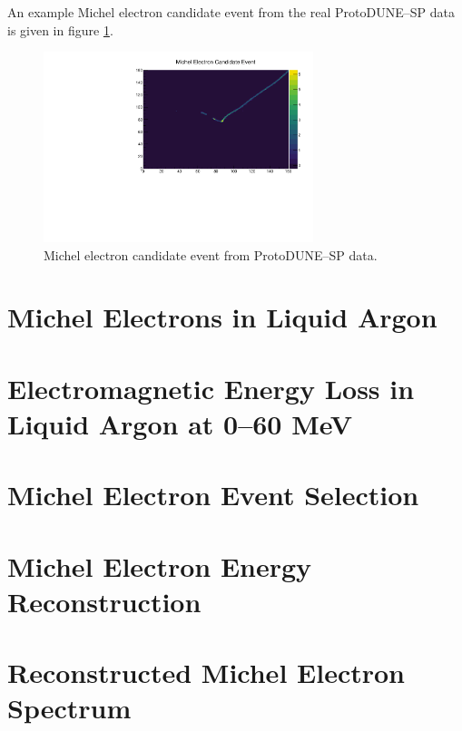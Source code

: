 \noindent An example Michel electron candidate event from the real ProtoDUNE--SP 
data is given in figure \ref{fig:michel_event}.

\begin{figure}[h]
	\centering
	\includegraphics[width=0.7\textwidth]{figures/michel_candidate.pdf}
	\caption[Michel electron candidate event from ProtoDUNE--SP data.]{Michel 
	electron candidate event from ProtoDUNE--SP data.}
	\label{fig:michel_event}
\end{figure}

\section{Michel Electrons in Liquid Argon}
\section{Electromagnetic Energy Loss in Liquid Argon at 0--60 MeV}
\section{Michel Electron Event Selection}
\section{Michel Electron Energy Reconstruction}
\section{Reconstructed Michel Electron Spectrum}

